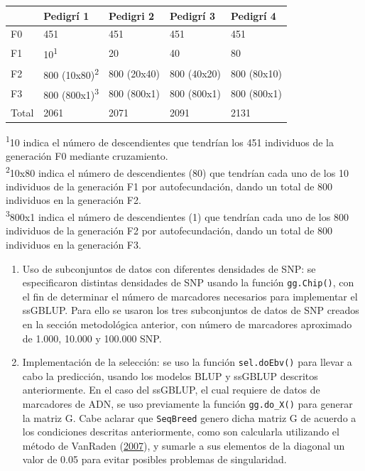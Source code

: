 \documentclass[11pt,spanish,a4paper,oneside,]{book} %
\begin{document}
\captionsetup[table]{labelformat=empty,skip=1pt}
\begin{longtable}{lllll}
\toprule
  & Pedigrí 1 & Pedigri 2 & Pedigrí 3 & Pedigrí 4 \\ 
\midrule
F0 & 451 & 451 & 451 & 451 \\ 
F1 & 10\textsuperscript{1} & 20 & 40 & 80 \\ 
F2 & 800 (10x80)\textsuperscript{2} & 800 (20x40) & 800 (40x20) & 800 (80x10) \\ 
F3 & 800 (800x1)\textsuperscript{3} & 800 (800x1) & 800 (800x1) & 800 (800x1) \\ 
Total & 2061 & 2071 & 2091 & 2131 \\ 
 \bottomrule
\end{longtable}
\vspace{-5mm}
\begin{minipage}{\linewidth}
\textsuperscript{1}10 indica el número de descendientes que tendrían los 451 individuos de la generación F0 mediante cruzamiento. \\ 
\textsuperscript{2}10x80 indica el número de descendientes (80) que tendrían cada uno de los 10 individuos de la generación F1 por autofecundación, dando un total de 800 individuos en la generación F2. \\ 
\textsuperscript{3}800x1 indica el número de descendientes (1) que tendrían cada uno de los 800 individuos de la generación F2 por autofecundación, dando un total de 800 individuos en la generación F3. \\ 
\end{minipage}

\begin{enumerate}
\def\labelenumi{\arabic{enumi}.}
\setcounter{enumi}{3}
\item
  Uso de subconjuntos de datos con diferentes densidades de SNP: se especificaron distintas densidades de SNP usando la función \texttt{gg.Chip()}, con el fin de determinar el número de marcadores necesarios para implementar el ssGBLUP. Para ello se usaron los tres subconjuntos de datos de SNP creados en la sección metodológica anterior, con número de marcadores aproximado de 1.000, 10.000 y 100.000 SNP.
\item
  Implementación de la selección: se uso la función \texttt{sel.doEbv()} para llevar a cabo la predicción, usando los modelos BLUP y ssGBLUP descritos anteriormente. En el caso del ssGBLUP, el cual requiere de datos de marcadores de ADN, se uso previamente la función \texttt{gg.do\_X()} para generar la matriz G. Cabe aclarar que \texttt{SeqBreed} genero dicha matriz G de acuerdo a los condiciones descritas anteriormente, como son calcularla utilizando el método de VanRaden (\protect\hyperlink{ref-cite:39}{2007}), y sumarle a sus elementos de la diagonal un valor de 0.05 para evitar posibles problemas de singularidad.
\end{enumerate}
\end{document}
